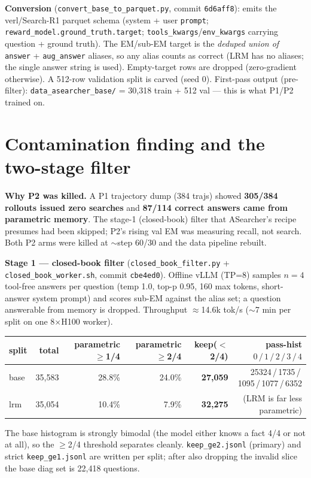 \documentclass[10pt]{article}
\newcommand{\cmd}[1]{\texttt{\small #1}}
\begin{document}
\textbf{Conversion} (\cmd{convert\_base\_to\_parquet.py}, commit \cmd{6d6aff8}): emits the verl/Search-R1
parquet schema (system + user \cmd{prompt}; \cmd{reward\_model.ground\_truth.target};
\cmd{tools\_kwargs}/\cmd{env\_kwargs} carrying question + ground truth). The EM/sub-EM target is the
\emph{deduped union of} \cmd{answer} + \cmd{aug\_answer} aliases, so any alias counts as correct
(LRM has no aliases; the single answer string is used). Empty-target rows are dropped (zero-gradient
otherwise). A 512-row validation split is carved (seed 0). First-pass output (pre-filter):
\cmd{data\_asearcher\_base/} = 30{,}318 train + 512 val --- this is what P1/P2 trained on.

\section{Contamination finding and the two-stage filter}
\textbf{Why P2 was killed.} A P1 trajectory dump (384 trajs) showed \textbf{305/384 rollouts issued zero
searches} and \textbf{87/114 correct answers came from parametric memory}. The stage-1 (closed-book)
filter that ASearcher's recipe presumes had been skipped; P2's rising val EM was measuring recall, not
search. Both P2 arms were killed at $\sim$step 60/30 and the data pipeline rebuilt.

\textbf{Stage 1 --- closed-book filter} (\cmd{closed\_book\_filter.py} + \cmd{closed\_book\_worker.sh},
commit \cmd{cbe4ed0}). Offline vLLM (TP=8) samples $n{=}4$ tool-free answers per question
(temp 1.0, top-p 0.95, 160 max tokens, short-answer system prompt) and scores sub-EM against the alias
set; a question answerable from memory is dropped. Throughput $\approx$14.6k tok/s ($\sim$7 min per
split on one 8$\times$H100 worker).

\begin{center}\small
\begin{tabular}{@{}lrrrrr@{}}
\toprule
split & total & parametric $\geq$1/4 & parametric $\geq$2/4 & keep($<$2/4) & pass-hist $0\,/\,1\,/\,2\,/\,3\,/\,4$ \\
\midrule
base & 35{,}583 & 28.8\% & 24.0\% & \textbf{27{,}059} & 25324\,/\,1735\,/\,1095\,/\,1077\,/\,6352 \\
lrm  & 35{,}054 & 10.4\% & \phantom{0}7.9\% & \textbf{32{,}275} & (LRM is far less parametric) \\
\bottomrule
\end{tabular}
\end{center}

The base histogram is strongly bimodal (the model either knows a fact 4/4 or not at all), so the
$\geq$2/4 threshold separates cleanly. \cmd{keep\_ge2.jsonl} (primary) and strict \cmd{keep\_ge1.jsonl}
are written per split; after also dropping the invalid slice the base diag set is 22{,}418 questions.
\end{document}
